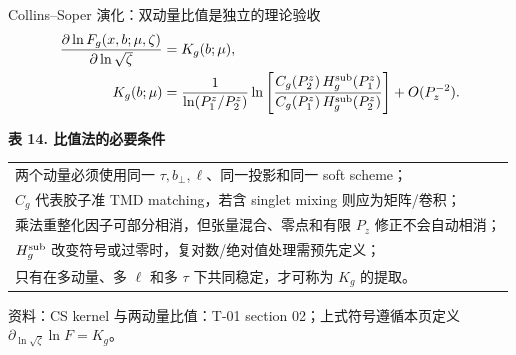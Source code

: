 \documentclass[UTF8,aspectratio=169,11pt]{ctexbeamer}
\newcommand{\source}[1]{%
  \par\vspace{-0.08em}%
  \noindent\parbox[t]{0.97\linewidth}{\raggedright\scriptsize\color{muted}资料：#1}\par}
\begin{document}
\begin{frame}[t]{Collins--Soper 演化：双动量比值是独立的理论验收}
  \begin{align*}
    \frac{\partial\ln F_g(x,b;\mu,\zeta)}{\partial\ln\sqrt\zeta}
    &=K_g(b;\mu),\\
    K_g(b;\mu)
    &=\frac{1}{\ln(P_1^z/P_2^z)}
      \ln\left[
      \frac{C_g(P_2^z)\,H_g^{\rm sub}(P_1^z)}
           {C_g(P_1^z)\,H_g^{\rm sub}(P_2^z)}
      \right]
      +O(P_z^{-2}) .
  \end{align*}
  \begin{center}
  \textbf{表 14. 比值法的必要条件}
  \vspace{0.12em}
  \begin{tabular}{@{}p{\linewidth}@{}}
    \toprule
    两个动量必须使用同一 $\tau,b_\perp,\ell$、同一投影和同一 soft scheme；\\
    $C_g$ 代表胶子准 TMD matching，若含 singlet mixing 则应为矩阵/卷积；\\
    乘法重整化因子可部分相消，但张量混合、零点和有限 $P_z$ 修正不会自动相消；\\
    $H_g^{\rm sub}$ 改变符号或过零时，复对数/绝对值处理需预先定义；\\
    只有在多动量、多 $\ell$ 和多 $\tau$ 下共同稳定，才可称为 $K_g$ 的提取。\\
    \bottomrule
  \end{tabular}
  \end{center}
  \source{CS kernel 与两动量比值：T-01 section 02；上式符号遵循本页定义 $\partial_{\ln\sqrt\zeta}\ln F=K_g$。}
\end{frame}
\end{document}
